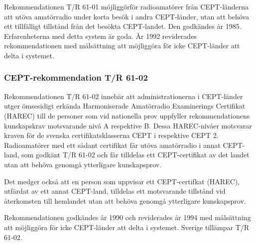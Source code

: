 Rekommendationen T/R 61-01 möjliggörför radioamatörer från
CEPT-länderna att utöva amatörradio under korta besök i andra
CEPT-länder, utan att behöva ett tillfälligt tillstånd från det besökta
CEPT-landet. Den godkändes år 1985. Erfarenheterna med detta system är
goda. År 1992 reviderades rekommendationen med målsättning att
möjliggöra för icke CEPT-länder att delta i systemet.

\subsubsection{CEPT-rekommendation T/R 61-02}

Rekommendationen T/R 61-02 innebär att administrationerna i
CEPT-länder utger ömsesidigt erkända Harmoniserade Amatörradio
Examinerings Certifikat (HAREC) till de personer som vid nationella
prov uppfyller rekommendationens kunskapskrav motsvarande nivå A
respektive B. Dessa HAREC-nivåer motsvarar kraven för de svenska
certifikatsklasserna CEPT i respektive CEPT 2. Radioamatörer med ett
sådant certifikat får utöva amatörradio i annat CEPT-land, som godkänt
T/R 61-02 och får tilldelas ett CEPT-certifikat av det landet utan att
behöva genomgå ytterligare kunskapsprov.

Det medger också att en person som uppvisar ett CEPT-certifkat
(HAREC), utfärdat av ett annat CEPT-land, tilldelas ett motsvarande
tillstånd vid återkomsten till hemlandet utan att behöva genomgå
ytterligare kunskapsprov.

Rekommendationen godkändes år 1990 och reviderades år 1994 med
målsättning att möjliggöra för icke CEPT-länder att delta i systemet.
Sverige tillämpar T/R 61-02.


